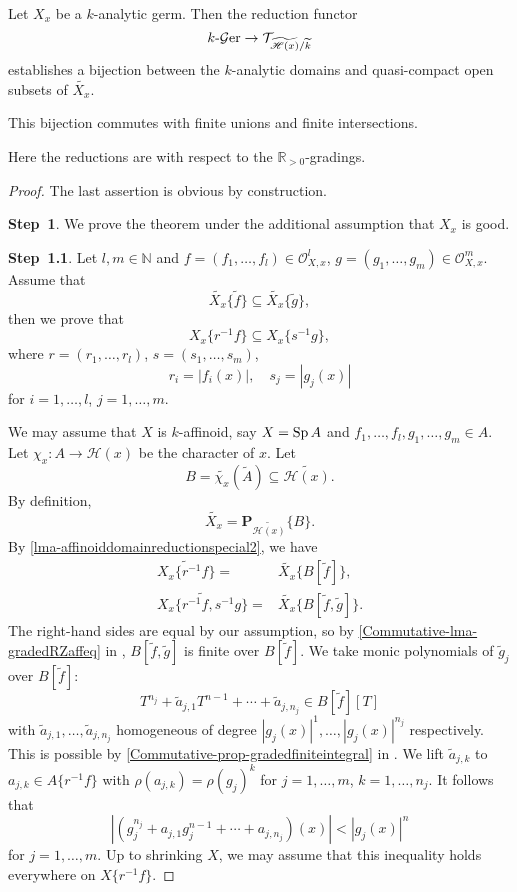 \begin{thm}\label{thm-gradedreddomainbij}
    Let $X_x$ be a $k$-analytic germ. Then the reduction functor  
    \[
        k\text{-}\mathcal{G}\mathrm{er}\rightarrow \mathcal{T}_{\widetilde{\mathscr{H}(x)}/\widetilde{k}} 
    \]
    establishes a bijection between the $k$-analytic domains and quasi-compact open subsets of $\widetilde{X_x}$.

    This bijection commutes with finite unions and finite intersections. 
\end{thm}
Here the reductions are with respect to the $\mathbb{R}_{>0}$-gradings.

\begin{proof}
    The last assertion is obvious by construction.

    \textbf{Step~1}. We prove the theorem under the additional assumption that $X_x$ is good.

    \textbf{Step~1.1}. Let $l,m\in \mathbb{N}$ and $f=(f_1,\ldots,f_l)\in \mathcal{O}_{X,x}^l$, $g=(g_1,\ldots,g_m)\in \mathcal{O}_{X,x}^m$. Assume that 
    \[
        \widetilde{X_x}\{\tilde{f}\}\subseteq  \widetilde{X_x}\{\tilde{g}\}, 
    \]
    then we prove that 
    \[
        X_x\{r^{-1}f\}\subseteq X_x\{s^{-1}g\},  
    \]
    where $r=(r_1,\ldots,r_l)$, $s=(s_1,\ldots,s_m)$,
    \[
        r_i=|f_i(x)|,\quad s_j=|g_j(x)|  
    \]
    for $i=1,\ldots,l$, $j=1,\ldots,m$.


    We may assume that $X$ is $k$-affinoid, say $X=\operatorname{Sp} A$ and $f_1,\ldots,f_l,g_1,\ldots,g_m\in A$. Let $\chi_x:A\rightarrow \mathscr{H}(x)$ be the character of $x$. Let
    \[
        B=\widetilde{\chi_x}(\tilde{A})\subseteq \widetilde{\mathscr{H}(x)}.  
    \]
    By definition,
    \[
        \widetilde{X_x}=\mathbf{P}_{\widetilde{\mathscr{H}(x)}}\{B\}.  
    \]
    By \cref{lma-affinoiddomainreductionspecial2}, we have
    \[
        \begin{aligned}
        \widetilde{X_x\{r^{-1}f\}}=&\widetilde{X_x}\{B[\tilde{f}]\},\\
        \widetilde{X_x\{r^{-1}f,s^{-1}g\}}=&\widetilde{X_x}\{B[\tilde{f},\tilde{g}]\}.
        \end{aligned}
    \]
    The right-hand sides are equal by our assumption, so by \cref{Commutative-lma-gradedRZaffeq} in , $B[\tilde{f},\tilde{g}]$ is finite over $B[\tilde{f}]$. We take monic polynomials of $\tilde{g}_j$ over $B[\tilde{f}]$:
    \[
        T^{n_j}+\tilde{a}_{j,1}T^{n-1}+\cdots+\tilde{a}_{j,n_j}\in B[\tilde{f}][T]
    \]
    with $\tilde{a}_{j,1},\ldots,\tilde{a}_{j,n_j}$ homogeneous of degree $|g_j(x)|^{1},\ldots,|g_j(x)|^{n_j}$ respectively. This is possible by \cref{Commutative-prop-gradedfiniteintegral} in . We lift $\tilde{a}_{j,k}$ to $a_{j,k}\in A\{r^{-1}f\}$ with $\rho(a_{j,k})=\rho(g_j)^k$ for $j=1,\ldots,m$, $k=1,\ldots,n_j$. It follows that 
    \[
        \left|\left(g_j^{n_j}+a_{j,1}g_j^{n-1}+\cdots+a_{j,n_j}\right)(x)\right|<|g_j(x)|^n
    \]
    for $j=1,\ldots,m$. Up to shrinking $X$, we may assume that this inequality holds everywhere on $X\{r^{-1}f\}$. 


\end{proof}
